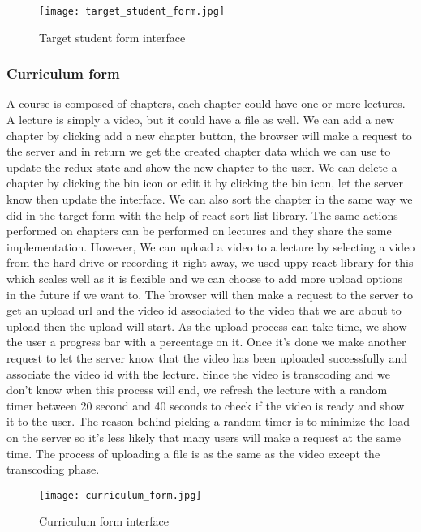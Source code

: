 \vfill
\clearpage

\begin{figure}[!ht]
    \centering
    \texttt{[image: target\_student\_form.jpg]}
    \caption{Target student form interface}
    \label{fig:target_student_form}
\end{figure}


\subsubsection{Curriculum form}
A course is composed of chapters, each chapter could have one or more lectures. A lecture is simply a video, but it could have a file as well.
\hfill \break
\hfill \break
We can add a new chapter by clicking add a new chapter button, the browser will make a request to the server and in return we get the created chapter data which we can use to update the redux state and show the new chapter to the user. We can delete a chapter by clicking the bin icon or edit it by clicking the bin icon, let the server know then update the interface. We can also sort the chapter in the same way we did in the target form with the help of react-sort-list library.
\hfill \break
\hfill \break
The same actions performed on chapters can be performed on lectures and they share the same implementation. However, We can upload a video to a lecture by selecting a video from the hard drive or recording it right away, we used uppy react library for this which scales well as it is flexible and we can choose to add more upload options in the future if we want to. The browser will then make a request to the server to get an upload url and the video id associated to the video that we are about to upload then the upload will start. As the upload process can take time, we show the user a progress bar with a percentage on it. Once it's done we make another request to let the server know that the video has been uploaded successfully and associate the video id with the lecture. Since the video is transcoding and we don't know when this process will end, we refresh the lecture with a random timer between 20 second and 40 seconds to check if the video is ready and show it to the user. The reason behind picking a random timer is to minimize the load on the server so it's less likely that many users will make a request at the same time. The process of uploading a file is as the same as the video except the transcoding phase.

\begin{figure}[!ht]
    \centering
    \texttt{[image: curriculum\_form.jpg]}
    \caption{Curriculum form interface}
    \label{fig:curriculum_form}
\end{figure}


